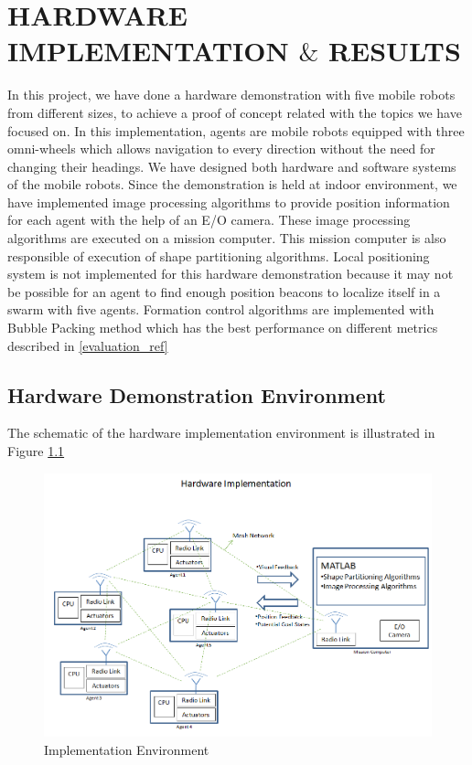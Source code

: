 

\chapter{HARDWARE IMPLEMENTATION $\&$ RESULTS}
\label{chp:hardware}









In this project, we have done a hardware demonstration with five mobile robots from different sizes, to achieve a proof of concept related with the topics we have focused on. In this implementation, agents are mobile robots equipped with three omni-wheels which allows navigation to every direction without the need for changing their headings. We have designed both hardware and software systems of the mobile robots. Since the demonstration is held at indoor environment, we have implemented image processing algorithms to provide  position information for each agent with the help of an E/O camera. These image processing algorithms are executed on a mission computer. This mission computer is also responsible of execution of shape partitioning algorithms. Local positioning system is not implemented for this hardware demonstration because it may not be possible for an agent to find enough position beacons to localize itself in a swarm with five agents. Formation control algorithms are implemented with Bubble Packing method which has the best performance on different metrics described in \ref{evaluation_ref}

\newpage
\section{Hardware Demonstration Environment}
The schematic of the hardware implementation environment is illustrated in Figure \ref{harware_ref}
   
\begin{figure}[H]
\caption{Implementation Environment} \label{harware_ref}
\centerline{\includegraphics[scale = 0.55]{hardware}}
\end{figure} 
   
